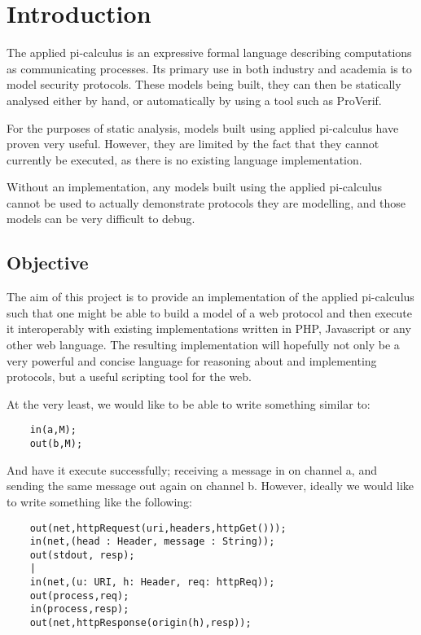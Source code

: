 \section{Introduction}

The applied pi-calculus is an expressive formal language describing computations as communicating processes. Its primary use in both industry and academia is to model security protocols. These models being built, they can then be statically analysed either by hand, or automatically by using a tool such as ProVerif. 

For the purposes of static analysis, models built using applied pi-calculus have proven very useful. However, they are limited by the fact that they cannot currently be executed, as there is no existing language implementation. 

Without an implementation, any models built using the applied pi-calculus cannot be used to actually demonstrate protocols they are modelling, and those models can be very difficult to debug.

\subsection{Objective}

The aim of this project is to provide an implementation of the applied pi-calculus such that one might be able to build a model of a web protocol and then execute it interoperably with existing implementations written in PHP, Javascript or any other web language. The resulting implementation will hopefully not only be a very powerful and concise language for reasoning about and implementing protocols, but a useful scripting tool for the web.

At the very least, we would like to be able to write something similar to:
    
\begin{verbatim}
    in(a,M); 
    out(b,M);
\end{verbatim}

And have it execute successfully; receiving a message in on channel a, and sending the same message out again on channel b. However, ideally we would like to write something like the following:

\begin{verbatim}
    out(net,httpRequest(uri,headers,httpGet()));
    in(net,(head : Header, message : String));
    out(stdout, resp);
    |
    in(net,(u: URI, h: Header, req: httpReq));
    out(process,req);
    in(process,resp);
    out(net,httpResponse(origin(h),resp));
\end{verbatim}

